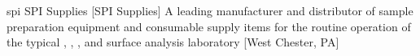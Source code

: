 \newglsXcompany%
{spi}%
{SPI Supplies\textsuperscript{\textregistered}}%
[SPI Supplies]%
{A leading manufacturer and distributor of sample preparation equipment and consumable supply items for the routine operation of the typical , , ,  and surface analysis laboratory \cite{website:SPI_Supplies}}%
[West Chester, PA]%